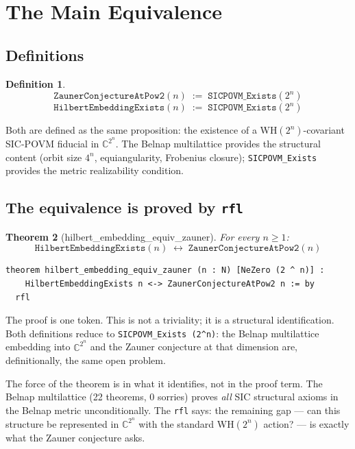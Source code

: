 \documentclass[12pt,a4paper]{article}
\newtheorem{theorem}{Theorem}[section]
\newtheorem{definition}[theorem]{Definition}
\begin{document}
\section{The Main Equivalence}
\label{sec:equiv}

\subsection{Definitions}

\begin{definition}
\[
\texttt{ZaunerConjectureAtPow2}(n) \;:=\; \texttt{SICPOVM\_Exists}(2^n)
\]
\[
\texttt{HilbertEmbeddingExists}(n) \;:=\; \texttt{SICPOVM\_Exists}(2^n)
\]
\end{definition}

Both are defined as the same proposition: the existence of a
WH$(2^n)$-covariant SIC-POVM fiducial in $\mathbb{C}^{2^n}$.
The Belnap multilattice provides the structural content (orbit size $4^n$,
equiangularity, Frobenius closure); \texttt{SICPOVM\_Exists} provides
the metric realizability condition.

\subsection{The equivalence is proved by \texttt{rfl}}

\begin{theorem}[hilbert\_embedding\_equiv\_zauner]
\label{thm:main-equiv}
For every $n \geq 1$:
\[
\texttt{HilbertEmbeddingExists}(n) \;\longleftrightarrow\; \texttt{ZaunerConjectureAtPow2}(n)
\]
\end{theorem}

\begin{lstlisting}
theorem hilbert_embedding_equiv_zauner (n : N) [NeZero (2 ^ n)] :
    HilbertEmbeddingExists n <-> ZaunerConjectureAtPow2 n := by
  rfl
\end{lstlisting}

The proof is one token.  This is not a triviality; it is a structural
identification.  Both definitions reduce to \texttt{SICPOVM\_Exists (2\^{}n)}:
the Belnap multilattice embedding into $\mathbb{C}^{2^n}$ and the Zauner
conjecture at that dimension are, definitionally, the same open problem.

The force of the theorem is in what it identifies, not in the proof term.
The Belnap multilattice (22 theorems, 0 sorries) proves \emph{all}
SIC structural axioms in the Belnap metric unconditionally.  The
\texttt{rfl} says: the remaining gap --- can this structure be represented
in $\mathbb{C}^{2^n}$ with the standard WH$(2^n)$ action? --- is exactly
what the Zauner conjecture asks.
\end{document}
